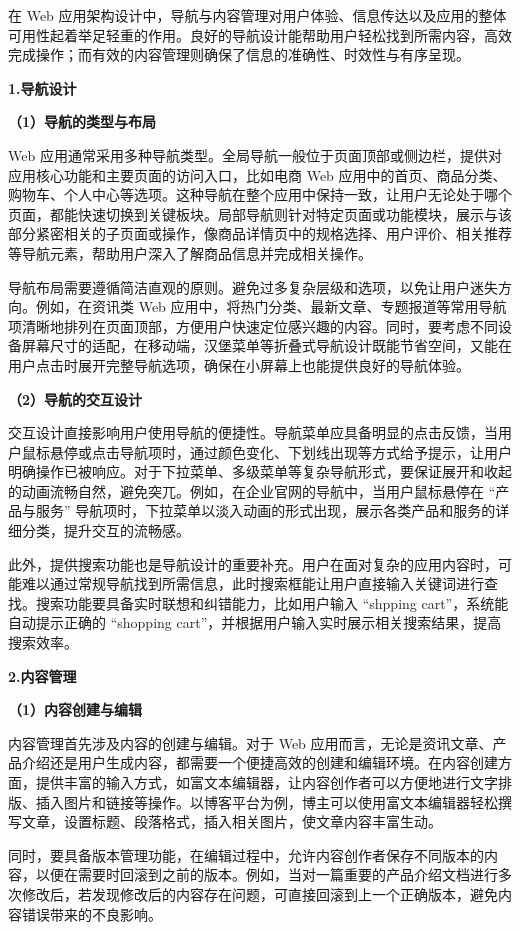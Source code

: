 在 Web 应用架构设计中，导航与内容管理对用户体验、信息传达以及应用的整体可用性起着举足轻重的作用。良好的导航设计能帮助用户轻松找到所需内容，高效完成操作；而有效的内容管理则确保了信息的准确性、时效性与有序呈现。

\textbf{1.导航设计}

\textbf{（1）导航的类型与布局}

Web 应用通常采用多种导航类型。全局导航一般位于页面顶部或侧边栏，提供对应用核心功能和主要页面的访问入口，比如电商 Web 应用中的首页、商品分类、购物车、个人中心等选项。这种导航在整个应用中保持一致，让用户无论处于哪个页面，都能快速切换到关键板块。局部导航则针对特定页面或功能模块，展示与该部分紧密相关的子页面或操作，像商品详情页中的规格选择、用户评价、相关推荐等导航元素，帮助用户深入了解商品信息并完成相关操作。

导航布局需要遵循简洁直观的原则。避免过多复杂层级和选项，以免让用户迷失方向。例如，在资讯类 Web 应用中，将热门分类、最新文章、专题报道等常用导航项清晰地排列在页面顶部，方便用户快速定位感兴趣的内容。同时，要考虑不同设备屏幕尺寸的适配，在移动端，汉堡菜单等折叠式导航设计既能节省空间，又能在用户点击时展开完整导航选项，确保在小屏幕上也能提供良好的导航体验。

\textbf{（2）导航的交互设计}

交互设计直接影响用户使用导航的便捷性。导航菜单应具备明显的点击反馈，当用户鼠标悬停或点击导航项时，通过颜色变化、下划线出现等方式给予提示，让用户明确操作已被响应。对于下拉菜单、多级菜单等复杂导航形式，要保证展开和收起的动画流畅自然，避免突兀。例如，在企业官网的导航中，当用户鼠标悬停在 ``产品与服务'' 导航项时，下拉菜单以淡入动画的形式出现，展示各类产品和服务的详细分类，提升交互的流畅感。

此外，提供搜索功能也是导航设计的重要补充。用户在面对复杂的应用内容时，可能难以通过常规导航找到所需信息，此时搜索框能让用户直接输入关键词进行查找。搜索功能要具备实时联想和纠错能力，比如用户输入 ``shpping cart''，系统能自动提示正确的 ``shopping cart''，并根据用户输入实时展示相关搜索结果，提高搜索效率。

\textbf{2.内容管理}

\textbf{（1）内容创建与编辑}

内容管理首先涉及内容的创建与编辑。对于 Web 应用而言，无论是资讯文章、产品介绍还是用户生成内容，都需要一个便捷高效的创建和编辑环境。在内容创建方面，提供丰富的输入方式，如富文本编辑器，让内容创作者可以方便地进行文字排版、插入图片和链接等操作。以博客平台为例，博主可以使用富文本编辑器轻松撰写文章，设置标题、段落格式，插入相关图片，使文章内容丰富生动。

同时，要具备版本管理功能，在编辑过程中，允许内容创作者保存不同版本的内容，以便在需要时回滚到之前的版本。例如，当对一篇重要的产品介绍文档进行多次修改后，若发现修改后的内容存在问题，可直接回滚到上一个正确版本，避免内容错误带来的不良影响。

